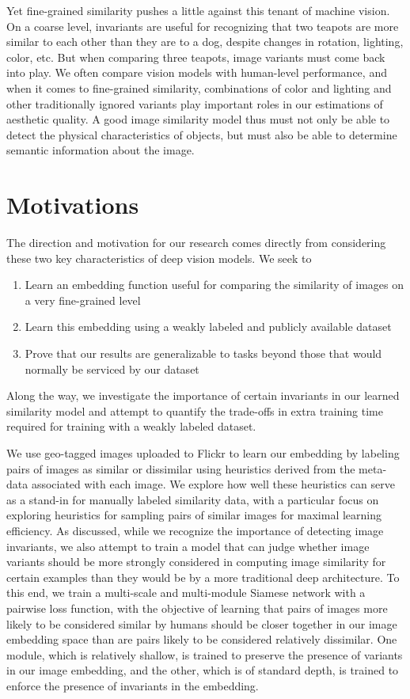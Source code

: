 Yet fine-grained similarity pushes a little against this tenant of machine vision. On a coarse level, invariants are useful for recognizing that two teapots are more similar to each other than they are to a dog, despite changes in rotation, lighting, color, etc. But when comparing three teapots, image variants must come back into play. We often compare vision models with human-level performance, and when it comes to fine-grained similarity, combinations of color and lighting and other traditionally ignored variants play important roles in our estimations of aesthetic quality. A good image similarity model thus must not only be able to detect the physical characteristics of objects, but must also be able to determine semantic information about the image. 


\section{Motivations}
The direction and motivation for our research comes directly from considering these two key characteristics of deep vision models. We seek to
\begin{enumerate}
	\item Learn an embedding function useful for comparing the similarity of images on a very fine-grained level
	\item Learn this embedding using a weakly labeled and publicly available dataset
	\item Prove that our results are generalizable to tasks beyond those that would normally be serviced by our dataset
\end{enumerate}

Along the way, we investigate the importance of certain invariants in our learned similarity model and attempt to quantify the trade-offs in extra training time required for training with a weakly labeled dataset.

We use geo-tagged images uploaded to Flickr to learn our embedding by labeling pairs of images as similar or dissimilar using heuristics derived from the meta-data associated with each image. We explore how well these heuristics can serve as a stand-in for manually labeled similarity data, with a particular focus on exploring heuristics for sampling pairs of similar images for maximal learning efficiency. As discussed, while we recognize the importance of detecting image invariants, we also attempt to train a model that can judge whether image variants should be more strongly considered in computing image similarity for certain examples than they would be by a more traditional deep architecture. To this end, we train a multi-scale and multi-module Siamese network with a pairwise loss function, with the objective of learning that pairs of images more likely to be considered similar by humans should be closer together in our image embedding space than are pairs likely to be considered relatively dissimilar. One module, which is relatively shallow, is trained to preserve the presence of variants in our image embedding, and the other, which is of standard depth, is trained to enforce the presence of invariants in the embedding.

